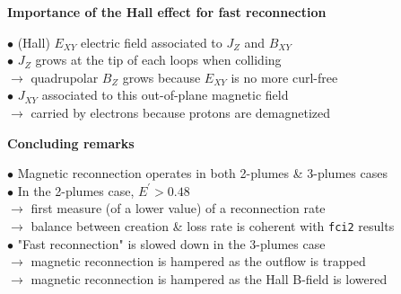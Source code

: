 \documentclass[landscape]{slides}
\begin{document}
\begin{slide}
{\large \textbf{Importance of the Hall effect for fast reconnection}}

\begin{center}

\end{center}

$\bullet$ (Hall) $E_{XY}$ electric field associated to $J_Z$ and $B_{XY}$ \\[0.3cm]
$\bullet$ $J_Z$ grows at the tip of each loops when colliding\\
$\to$ quadrupolar $B_Z$ grows because $E_{XY}$ is no more curl-free\\[0.3cm]
$\bullet$ $J_{XY}$ associated to this out-of-plane magnetic field\\
$\to$ carried by electrons because protons are demagnetized

\end{slide}



\begin{slide}
{\large \textbf{Concluding remarks}}

$\bullet$ Magnetic reconnection operates in both 2-plumes \& 3-plumes cases \\[0.6cm]
$\bullet$ In the 2-plumes case, $E^{\prime} > 0.48$ \\
$\to$ first measure (of a lower value) of a reconnection rate \\
$\to$ balance between creation \& loss rate is coherent with \texttt{fci2} results \\[0.6cm]
$\bullet$ "Fast reconnection" is slowed down in the 3-plumes case \\
$\to$ magnetic reconnection is hampered as the outflow is trapped \\
$\to$ magnetic reconnection is hampered as the Hall B-field is lowered \\

\end{slide}
\end{document}

